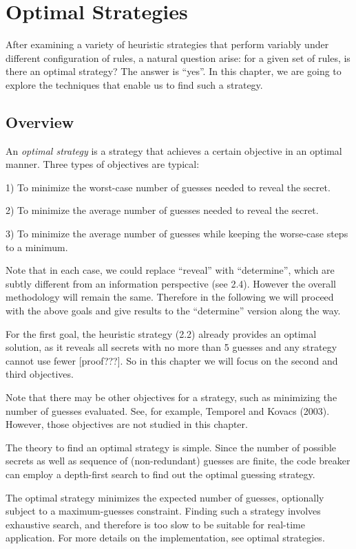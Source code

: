 \chapter{Optimal Strategies}

After examining a variety of heuristic strategies that perform variably under different configuration of rules, a natural question arise: for a given set of rules, is there an optimal strategy? The answer is ``yes''. In this chapter, we are going to explore the techniques that enable us to find such a strategy.

\section{Overview}

An \emph{optimal strategy} is a strategy that achieves a certain objective in an optimal manner. Three types of objectives are typical:

1) To minimize the worst-case number of guesses needed to reveal the secret.

2) To minimize the average number of guesses needed to reveal the secret.

3) To minimize the average number of guesses while keeping the worse-case steps to a minimum.

Note that in each case, we could replace ``reveal'' with ``determine'', which are subtly different from an information perspective (see 2.4). However the overall methodology will remain the same. Therefore in the following we will proceed with the above goals and give results to the ``determine'' version along the way.

For the first goal, the \minmax{} heuristic strategy (2.2) already provides an optimal solution, as it reveals all secrets with no more than 5 guesses and any strategy cannot use fewer [proof???]. So in this chapter we will focus on the second and third objectives.

Note that there may be other objectives for a strategy, such as minimizing the number of guesses evaluated. See, for example, Temporel and Kovacs (2003). However, those objectives are not studied in this chapter.

The theory to find an optimal strategy is simple. Since the number of possible secrets as well as sequence of (non-redundant) guesses are finite, the code breaker can employ a depth-first search to find out the optimal guessing strategy.

The optimal strategy minimizes the expected number of guesses, optionally subject to a maximum-guesses constraint. Finding such a strategy involves exhaustive search, and therefore is too slow to be suitable for real-time application. For more details on the implementation, see optimal strategies.

